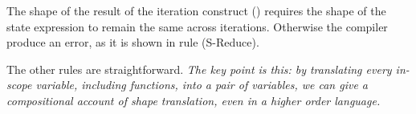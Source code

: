 The shape of the result of the iteration construct (\viteratek) requires the shape of 
the state expression to remain the same across iterations. Otherwise the compiler
produce an error, as it is shown in rule (S-Reduce).  

The other rules are straightforward.  \emph{The key point is this: by translating every in-scope variable, including functions, into a pair of variables, we can give a \emph{compositional} account of shape translation, even in a higher order language.}




